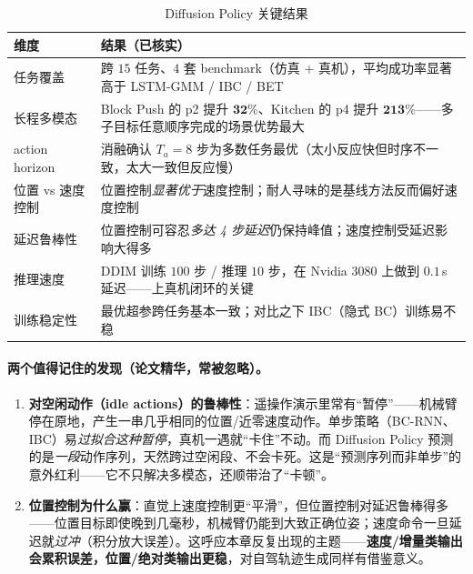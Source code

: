 \begin{table}[H]\centering\small
\caption{Diffusion Policy 关键结果}
\label{tab:de-dp-metrics}
\begin{tabular}{p{} p{}}
\toprule
维度 & 结果（已核实） \\
\midrule
任务覆盖 & 跨 $15$ 任务、$4$ 套 benchmark（仿真 $+$ 真机），平均成功率显著高于 LSTM-GMM / IBC / BET \\
长程多模态 & Block Push 的 p2 提升 $\mathbf{32\%}$、Kitchen 的 p4 提升 $\mathbf{213\%}$——多子目标任意顺序完成的场景优势最大 \\
action horizon & 消融确认 $T_a=8$ 步为多数任务最优（太小反应快但时序不一致，太大一致但反应慢） \\
位置 vs 速度控制 & 位置控制\emph{显著优于}速度控制；耐人寻味的是基线方法反而偏好速度控制 \\
延迟鲁棒性 & 位置控制可容忍\emph{多达 4 步延迟}仍保持峰值；速度控制受延迟影响大得多 \\
推理速度 & DDIM 训练 $100$ 步 / 推理 $10$ 步，在 Nvidia 3080 上做到 $\mathbf{0.1}$\,s 延迟——上真机闭环的关键 \\
训练稳定性 & 最优超参跨任务基本一致；对比之下 IBC（隐式 BC）训练易不稳 \\
\bottomrule
\end{tabular}
\end{table}

\paragraph{两个值得记住的发现（论文精华，常被忽略）。}
\begin{enumerate}
  \item \textbf{对空闲动作（idle actions）的鲁棒性}：遥操作演示里常有“暂停”——机械臂停在原地，产生一串几乎相同的位置/近零速度动作。单步策略（BC-RNN、IBC）易\emph{过拟合这种暂停}，真机一遇就“卡住”不动。而 Diffusion Policy 预测的是\emph{一段}动作序列，天然跨过空闲段、不会卡死。这是“预测序列而非单步”的意外红利——它不只解决多模态，还顺带治了“卡顿”。
  \item \textbf{位置控制为什么赢}：直觉上速度控制更“平滑”，但位置控制对延迟鲁棒得多——位置目标即使晚到几毫秒，机械臂仍能到大致正确位姿；速度命令一旦延迟就\emph{过冲}（积分放大误差）。这呼应本章反复出现的主题——\textbf{速度/增量类输出会累积误差，位置/绝对类输出更稳}，对自驾轨迹生成同样有借鉴意义。
\end{enumerate}

